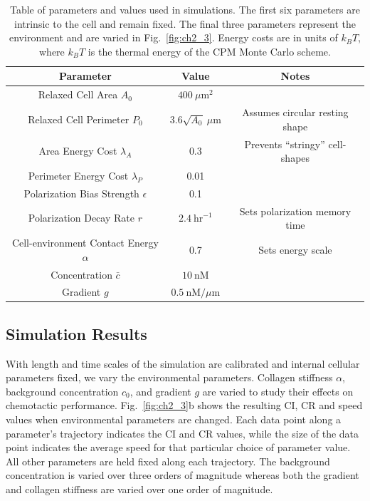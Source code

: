 \begin{table}[ht]
\begin{center}
\begin{tabular}{ |c|c|c| }
\hline
Parameter & Value & Notes \\ \hline
Relaxed Cell Area $A_0$ & $400 \ \mu\text{m}^2$ & \\ \hline
Relaxed Cell Perimeter $P_0$ & $3.6\sqrt{A_0} \ \mu\text{m}$ & Assumes circular resting shape \\ \hline
Area Energy Cost $\lambda_A$ & 0.3  & Prevents ``stringy'' cell-shapes \\
Perimeter Energy Cost $\lambda_P$ & 0.01 & \\ \hline
Polarization Bias Strength $\epsilon$ & 0.1 & \\ \hline
Polarization Decay Rate $r$ & $2.4 \ \text{hr}^{-1}$ & Sets polarization memory time \\ \hline \hline
Cell-environment Contact Energy $\alpha$ & 0.7 & Sets energy scale \\ \hline
Concentration $\bar{c}$ & $10 \ \text{nM}$ & \\
Gradient $g$ & $0.5 \ \text{nM/}\mu\text{m}$ & \\ \hline
\end{tabular}
\caption{Table of parameters and values used in simulations. The first six parameters are intrinsic to the cell and remain fixed. The final three parameters represent the environment and are varied in Fig.\ \ref{fig:ch2_3}. Energy costs are in units of $k_B T$, where $k_B T$ is the thermal energy of the CPM Monte Carlo scheme.}
\label{table:ch2_1}
\end{center}
\end{table}


\subsection{Simulation Results}

With length and time scales of the simulation are calibrated and internal cellular parameters fixed, we vary the environmental parameters. Collagen stiffness $\alpha$, background concentration $c_0$, and gradient $g$ are varied to study their effects on chemotactic performance. Fig.\ \ref{fig:ch2_3}b shows the resulting CI, CR and speed values when environmental parameters are changed. Each data point along a parameter's trajectory indicates the CI and CR values, while the size of the data point indicates the average speed for that particular choice of parameter value. All other parameters are held fixed along each trajectory. The background concentration is varied over three orders of magnitude whereas both the gradient and collagen stiffness are varied over one order of magnitude.

